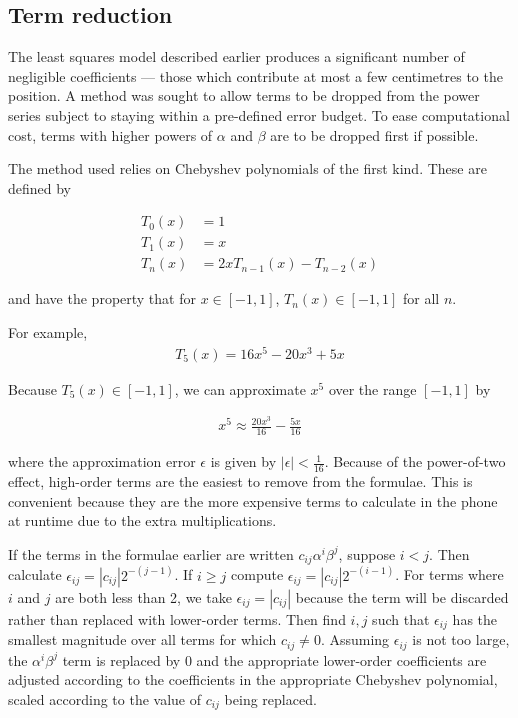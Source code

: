 \documentclass[10pt,a4paper]{article}
\begin{document}
\subsection{Term reduction}
\label{sec:reduction}
The least squares model described earlier produces a significant number of
negligible coefficients --- those which contribute at most a few centimetres to
the position.  A method was sought to allow terms to be dropped from the power
series subject to staying within a pre-defined error budget.  To ease
computational cost, terms with higher powers of $\alpha$ and $\beta$ are to be
dropped first if possible.

The method used relies on Chebyshev polynomials of the first kind.  These are defined by

\begin{align}
  T_0(x) & = 1 \\
  T_1(x) &= x \\
  T_n(x) &= 2xT_{n-1}(x) - T_{n-2}(x)
\end{align}

and have the property that for $x \in [-1,1]$, $T_n(x) \in [-1,1]$ for all $n$.

For example,
\begin{align}
  T_5(x) = 16x^5 - 20x^3 + 5x
\end{align}

Because $T_5(x) \in [-1,1]$, we can approximate $x^5$ over the range $[-1,1]$ by

\begin{align}
  x^5 \approx \frac{20x^3}{16} - \frac{5x}{16}
\end{align}

where the approximation error $\epsilon$ is given by $|\epsilon| <
\frac{1}{16}$.  Because of the power-of-two effect, high-order terms are the
easiest to remove from the formulae.  This is convenient because they are the
more expensive terms to calculate in the phone at runtime due to the extra
multiplications.

If the terms in the formulae earlier are written $c_{ij}\alpha^i\beta^j$,
suppose $i<j$.  Then calculate $\epsilon_{ij} = |c_{ij}|2^{-(j-1)}$.  If $i\ge j$
compute $\epsilon_{ij} = |c_{ij}|2^{-(i-1)}$.
For terms where $i$ and $j$ are both less than 2, we take $\epsilon_{ij} =
|c_{ij}|$ because the term will be discarded rather than replaced with
lower-order terms.
Then find $i,j$ such that $\epsilon_{ij}$ has the smallest magnitude over all
terms for which $c_{ij} \ne 0$.  Assuming $\epsilon_{ij}$ is not too large, the
$\alpha^i\beta^j$ term is replaced by 0 and the appropriate lower-order
coefficients are adjusted according to the coefficients in the appropriate
Chebyshev polynomial, scaled according to the value of $c_{ij}$ being replaced.
\end{document}
